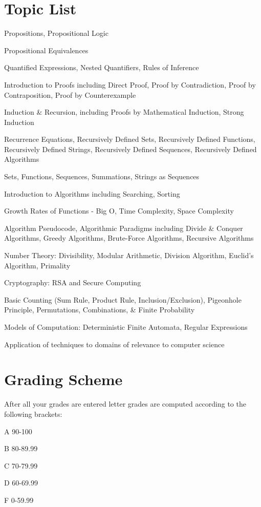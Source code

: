 \documentclass{article}
\begin{document}
\section{Topic List}
Propositions, Propositional Logic

Propositional Equivalences

Quantified Expressions, Nested Quantifiers, Rules of Inference

Introduction to Proofs including Direct Proof, Proof by Contradiction, Proof by Contraposition, Proof by Counterexample

Induction & Recursion, including Proofs by Mathematical Induction, Strong Induction

Recurrence Equations, Recursively Defined Sets, Recursively Defined Functions, Recursively Defined Strings,
Recursively Defined Sequences, Recursively Defined Algorithms

Sets, Functions, Sequences, Summations, Strings as Sequences

Introduction to Algorithms including Searching, Sorting

Growth Rates of Functions - Big O, Time Complexity, Space Complexity

Algorithm Pseudocode, Algorithmic Paradigms including Divide & Conquer Algorithms, Greedy Algorithms,
Brute-Force Algorithms, Recursive Algorithms

Number Theory: Divisibility, Modular Arithmetic, Division Algorithm, Euclid’s Algorithm, Primality

Cryptography: RSA and Secure Computing 

Basic Counting (Sum Rule, Product Rule, Inclusion/Exclusion), Pigeonhole Principle, Permutations, Combinations,
& Finite Probability

Models of Computation: Deterministic Finite Automata, Regular Expressions

Application of techniques to domains of relevance to computer science


\section{Grading Scheme}
After all your grades are entered letter grades are computed according to the following brackets:

A 90-100

B 80-89.99

C 70-79.99

D 60-69.99

F 0-59.99
\end{document}
